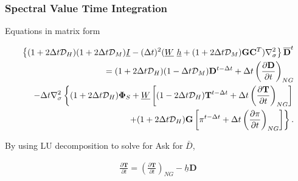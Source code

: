 \hypertarget{spectral-value-time-integration}{%
\subsubsection{Spectral Value Time
Integration}\label{spectral-value-time-integration}}

Equations in matrix form

\begin{eqnarray}
      \left\{ ( 1+2\Delta t {\mathcal D}_H )( 1+2\Delta t {\mathcal D}_M )
           \underline{I}  
      - ( \Delta t )^{2}  ( \underline{W} \ \underline{h} 
           + (1+2\Delta t {\mathcal D}_M)
             \mathbf{G} \mathbf{C}^{T} ) \nabla^{2}_{\sigma}
  \right\}
      \overline{ \mathbf{D} }^{t} 
       \\
  = ( 1+2\Delta t {\mathcal D}_H )( 1-\Delta t {\mathcal D}_M ) 
       \mathbf{D}^{t-\Delta t}
  + \Delta t 
         \left( \frac{\partial \mathbf{D}}{\partial t} \right)_{NG}  
  \\
  -  \Delta t \nabla^{2}_{\sigma}     
                   \left\{  ( 1+2\Delta t {\mathcal D}_H ) \mathbf{\Phi}_{S} 
                          + \underline{W} 
                            \left[ ( 1-2\Delta t {\mathcal D}_H ) 
                                    \mathbf{T}^{t-\Delta t}
                                  + \Delta t 
                                      \left( \frac{\partial \mathbf{T}}
                                                  {\partial t}     
                                      \right)_{NG} \right]
                   \right.
  \\
                 \left.  \hspace*{20mm} 
                          + ( 1+2\Delta t {\mathcal D}_H ) \mathbf{G} 
                            \left[ \pi^{t-\Delta t} 
                                  + \Delta t
                                     \left( \frac{\partial \pi}
                                                 {\partial t} 
                                     \right)_{NG}  \right]
                   \right\} . 
\end{eqnarray}

By using LU decomposition to solve for Ask for \(\bar{D}\),

\begin{eqnarray}
  \frac{\partial \mathbf{T}}{\partial t} 
      =   \left( \frac{\partial \mathbf{T}}
                        {\partial t}       \right)_{NG}  
         - \underline{h} \mathbf{D}
\end{eqnarray}

